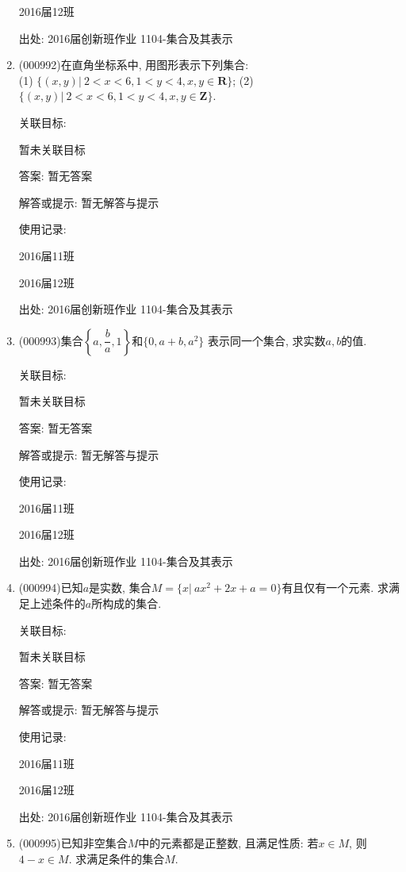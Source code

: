 \documentclass[10pt,a4paper]{article}
\begin{document}
\begin{enumerate}[1.]
2016届12班		


出处: 2016届创新班作业	1104-集合及其表示
\item { (000992)}在直角坐标系中, 用图形表示下列集合:\\ 
(1) $\{(x,y)|\ 2<x<6,1<y<4,x,y\in\mathbf{R}\}$; \hfill (2) $\{(x,y)|\ 2<x<6,1<y<4,x,y\in\mathbf{Z}\}$.


关联目标:

暂未关联目标

答案: 暂无答案

解答或提示: 暂无解答与提示

使用记录:

2016届11班		

2016届12班		


出处: 2016届创新班作业	1104-集合及其表示
\item { (000993)}集合$\left\{a,\dfrac{b}{a},1\right\}$和$\{0,a+b,a^2\}$ 表示同一个集合, 求实数$a,b$的值.


关联目标:

暂未关联目标

答案: 暂无答案

解答或提示: 暂无解答与提示

使用记录:

2016届11班	

2016届12班	


出处: 2016届创新班作业	1104-集合及其表示
\item { (000994)}已知$a$是实数, 集合$M=\{x|\ ax^2+2x+a=0\}$有且仅有一个元素. 求满足上述条件的$a$所构成的集合.


关联目标:

暂未关联目标

答案: 暂无答案

解答或提示: 暂无解答与提示

使用记录:

2016届11班	

2016届12班	


出处: 2016届创新班作业	1104-集合及其表示
\item { (000995)}已知非空集合$M$中的元素都是正整数, 且满足性质: 若$x\in M$, 则$4-x\in M$. 求满足条件的集合$M$.



\end{enumerate}
\end{document}
